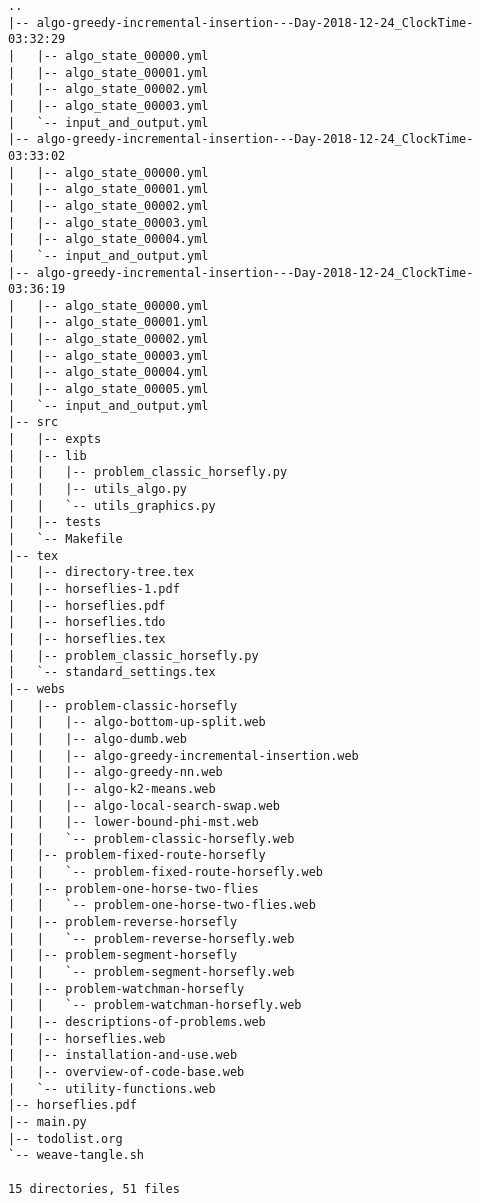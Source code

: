 \begin{verbatim}
..
|-- algo-greedy-incremental-insertion---Day-2018-12-24_ClockTime-03:32:29
|   |-- algo_state_00000.yml
|   |-- algo_state_00001.yml
|   |-- algo_state_00002.yml
|   |-- algo_state_00003.yml
|   `-- input_and_output.yml
|-- algo-greedy-incremental-insertion---Day-2018-12-24_ClockTime-03:33:02
|   |-- algo_state_00000.yml
|   |-- algo_state_00001.yml
|   |-- algo_state_00002.yml
|   |-- algo_state_00003.yml
|   |-- algo_state_00004.yml
|   `-- input_and_output.yml
|-- algo-greedy-incremental-insertion---Day-2018-12-24_ClockTime-03:36:19
|   |-- algo_state_00000.yml
|   |-- algo_state_00001.yml
|   |-- algo_state_00002.yml
|   |-- algo_state_00003.yml
|   |-- algo_state_00004.yml
|   |-- algo_state_00005.yml
|   `-- input_and_output.yml
|-- src
|   |-- expts
|   |-- lib
|   |   |-- problem_classic_horsefly.py
|   |   |-- utils_algo.py
|   |   `-- utils_graphics.py
|   |-- tests
|   `-- Makefile
|-- tex
|   |-- directory-tree.tex
|   |-- horseflies-1.pdf
|   |-- horseflies.pdf
|   |-- horseflies.tdo
|   |-- horseflies.tex
|   |-- problem_classic_horsefly.py
|   `-- standard_settings.tex
|-- webs
|   |-- problem-classic-horsefly
|   |   |-- algo-bottom-up-split.web
|   |   |-- algo-dumb.web
|   |   |-- algo-greedy-incremental-insertion.web
|   |   |-- algo-greedy-nn.web
|   |   |-- algo-k2-means.web
|   |   |-- algo-local-search-swap.web
|   |   |-- lower-bound-phi-mst.web
|   |   `-- problem-classic-horsefly.web
|   |-- problem-fixed-route-horsefly
|   |   `-- problem-fixed-route-horsefly.web
|   |-- problem-one-horse-two-flies
|   |   `-- problem-one-horse-two-flies.web
|   |-- problem-reverse-horsefly
|   |   `-- problem-reverse-horsefly.web
|   |-- problem-segment-horsefly
|   |   `-- problem-segment-horsefly.web
|   |-- problem-watchman-horsefly
|   |   `-- problem-watchman-horsefly.web
|   |-- descriptions-of-problems.web
|   |-- horseflies.web
|   |-- installation-and-use.web
|   |-- overview-of-code-base.web
|   `-- utility-functions.web
|-- horseflies.pdf
|-- main.py
|-- todolist.org
`-- weave-tangle.sh

15 directories, 51 files
\end{verbatim}
